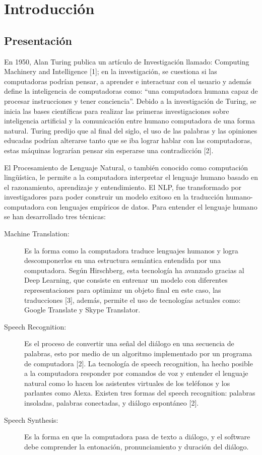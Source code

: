 \chapter{Introducción}

\section{Presentación}

    En 1950, Alan Turing publica un artículo de Investigación llamado: Computing Machinery and Intelligence [1]; en la investigación, se cuestiona si las computadoras podrían pensar, a aprender e interactuar con el usuario y además define la inteligencia de computadoras como: “una computadora humana capaz de procesar instrucciones y tener conciencia”. Debido a la investigación de Turing, se inicia las bases científicas para realizar las primeras investigaciones sobre inteligencia artificial y la comunicación entre humano computadora de una forma natural. Turing predijo que al final del siglo, el uso de las palabras y las opiniones educadas podrían alterarse tanto que se iba lograr hablar con las computadoras, estas máquinas lograrían pensar sin esperarse una contradicción [2].
    
    El Procesamiento de Lenguaje Natural, o también conocido como computación lingüística, le permite a la computadora interpretar el lenguaje humano basado en el razonamiento, aprendizaje y entendimiento. El NLP, fue transformado por investigadores para poder construir un modelo exitoso en la traducción humano-computadora con lenguajes empíricos de datos. Para entender el lenguaje humano se han desarrollado tres técnicas:
    \begin{description}
        
        \item[Machine Translation:]Es la forma como la computadora traduce lenguajes humanos y logra descomponerlos en una estructura semántica entendida por una computadora. Según Hirschberg, esta tecnología ha avanzado gracias al Deep Learning, que consiste en entrenar un modelo con diferentes representaciones para optimizar un objeto final en este caso, las traducciones [3], además, permite el uso de tecnologías actuales como: Google Translate y Skype Translator.
        \item[Speech Recognition:] Es el proceso de convertir una señal del diálogo en una secuencia de palabras, esto por medio de un algoritmo implementado por un programa de computadora [2]. La tecnología de speech recognition, ha hecho posible a la computadora responder por comandos de voz y entender el lenguaje natural como lo hacen los asistentes virtuales de los teléfonos y los parlantes como Alexa. Existen tres formas del speech recognition: palabras insoladas, palabras conectadas, y diálogo espontáneo [2].
        
        \item[Speech Synthesis:] Es la forma en que la computadora pasa de texto a diálogo, y el software debe comprender la entonación, pronunciamiento y duración del diálogo.
    
    \end{description}
    
